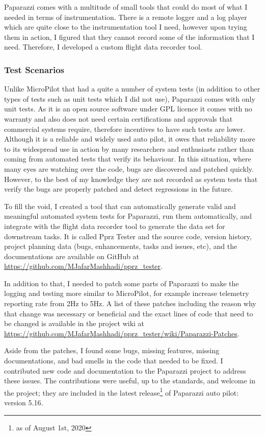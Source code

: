 Paparazzi comes with a multitude of small tools that could do most of what I needed in terms of instrumentation. There is a remote logger and a log player which are quite close to the instrumentation tool I need, however upon trying them in action, I figured that they cannot record some of the information that I need. Therefore, I developed a custom flight data recorder tool. 

\subsubsection{Test Scenarios}
Unlike MicroPilot that had a quite a number of system tests (in addition to other types of tests such as unit tests which I did not use), Paparazzi comes with only unit tests. As it is an open source software under GPL licence it comes with no warranty and also does not need certain certifications and approvals that commercial systems require, therefore incentives to have such tests are lower. 
Although it is a reliable and widely used auto pilot, it owes that reliability more to its widespread use in action by many researchers and enthusiasts rather than coming from automated tests that verify its behaviour.
In this situation, where many eyes are watching over the code, bugs are discovered and patched quickly. However, to the best of my knowledge they are not recorded as system tests that verify the bugs are properly patched and detect regressions in the future.

To fill the void, I created a tool that can automatically generate valid and meaningful automated system tests for Paparazzi, run them automatically, and integrate with the flight data recorder tool to generate the data set for downstream tasks. It is called Pprz Tester and the source code, version history, project planning data (bugs, enhancements, tasks and issues, etc), and the documentations are available on GitHub at \url{https://github.com/MJafarMashhadi/pprz_tester}. 

In addition to that, I needed to patch some parts of Paparazzi to make the logging and testing more similar to MicroPilot, for example increase telemetry reporting rate from 2Hz to 5Hz. A list of these patches including the reason why that change was necessary or beneficial and the exact lines of code that need to be changed is available in the project wiki at \url{https://github.com/MJafarMashhadi/pprz_tester/wiki/Paparazzi-Patches}.

Aside from the patches, I found some bugs, missing features, missing documentations, and bad smells in the code that needed to be fixed. I contributed new code and documentation to the Paparazzi project to address these issues. The contributions were useful, up to the standards, and welcome in the project; they are included in the latest release\footnote{as of August 1st, 2020} of Paparazzi auto pilot: version 5.16.


